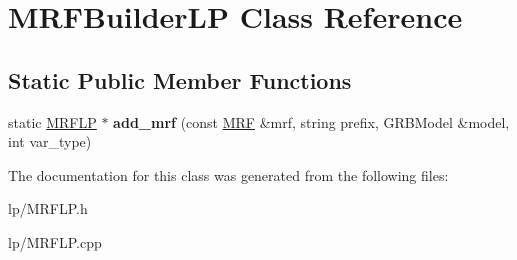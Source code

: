 \hypertarget{class_m_r_f_builder_l_p}{
\section{MRFBuilderLP Class Reference}
\label{class_m_r_f_builder_l_p}
}
\subsection*{Static Public Member Functions}
\begin{DoxyCompactItemize}
\item 
\hypertarget{class_m_r_f_builder_l_p_aaace30ed1c0dfb1b0c5c89a22b503e10}{
static \hyperlink{struct_m_r_f_l_p}{MRFLP} $\ast$ {\bfseries add\_\-mrf} (const \hyperlink{class_m_r_f}{MRF} \&mrf, string prefix, GRBModel \&model, int var\_\-type)}
\label{class_m_r_f_builder_l_p_aaace30ed1c0dfb1b0c5c89a22b503e10}

\end{DoxyCompactItemize}


The documentation for this class was generated from the following files:\begin{DoxyCompactItemize}
\item 
lp/MRFLP.h\item 
lp/MRFLP.cpp\end{DoxyCompactItemize}
